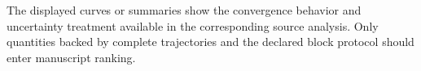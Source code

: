 The displayed curves or summaries show the convergence behavior and uncertainty treatment available in the corresponding source analysis. Only quantities backed by complete trajectories and the declared block protocol should enter manuscript ranking.
